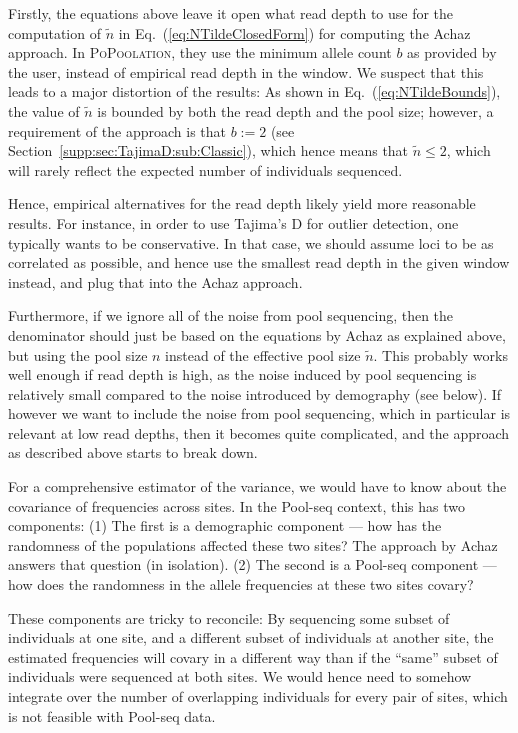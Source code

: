 \documentclass[letterpaper,fontsize=9pt,DIV=12]{scrartcl}
\newcommand\toolname{\textsc}
\newcommand\eqnref[1]{Eq.~(\ref{#1})}
\newcommand\secref[1]{Section~\ref{#1}}
\begin{document}
Firstly, the equations above leave it open what read depth to use for the computation of $\tilde{n}$ in \eqnref{eq:NTildeClosedForm} for computing the Achaz approach.  In \toolname{PoPoolation}, they use the minimum allele count $b$ as provided by the user, instead of empirical read depth in the window.  We suspect that this leads to a major distortion of the results:  As shown in \eqnref{eq:NTildeBounds}, the value of $\tilde{n}$ is bounded by both the read depth and the pool size; however, a requirement of the approach is that $b := 2$ (see \secref{supp:sec:TajimaD:sub:Classic}), which hence means that $\tilde{n} \leq 2$, which will rarely reflect the expected number of individuals sequenced.

Hence, empirical alternatives for the read depth likely yield more reasonable results. For instance, in order to use Tajima's D for outlier detection, one typically wants to be conservative. In that case, we should assume loci to be as correlated as possible, and hence use the smallest read depth in the given window instead, and plug that into the Achaz approach.

Furthermore, if we ignore all of the noise from pool sequencing, then the denominator should just be based on the equations by Achaz as explained above, but using the pool size $n$ instead of the effective pool size $\tilde{n}$.  This probably works well enough if read depth is high, as the noise induced by pool sequencing is relatively small compared to the noise introduced by demography (see below).  If however we want to include the noise from pool sequencing, which in particular is relevant at low read depths, then it becomes quite complicated, and the approach as described above starts to break down.

For a comprehensive estimator of the variance, we would have to know about the covariance of frequencies across sites. In the Pool-seq context, this has two components: (1) The first is a demographic component --- how has the randomness of the populations affected these two sites? The approach by Achaz answers that question (in isolation).  (2) The second is a Pool-seq component --- how does the randomness in the allele frequencies at these two sites covary?

These components are tricky to reconcile: By sequencing some subset of individuals at one site, and a different subset of individuals at another site, the estimated frequencies will covary in a different way than if the ``same'' subset of individuals were sequenced at both sites.  We would hence need to somehow integrate over the number of overlapping individuals for every pair of sites, which is not feasible with Pool-seq data.
\end{document}
